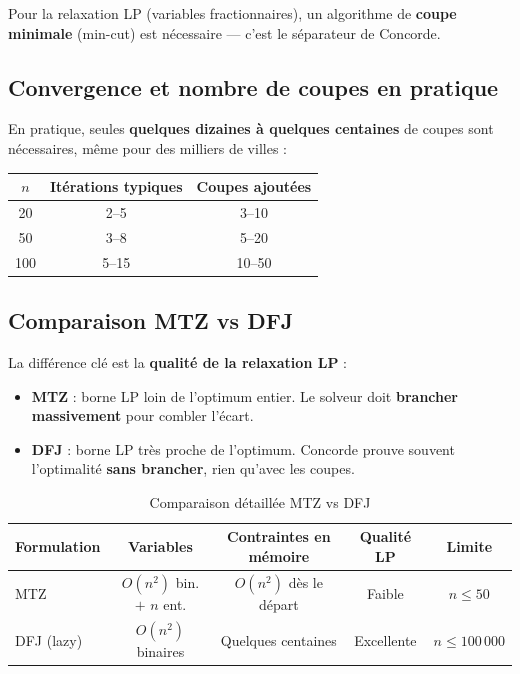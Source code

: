 \documentclass[12pt, a4paper]{article}
\begin{document}
Pour la relaxation LP (variables fractionnaires), un algorithme de
\textbf{coupe minimale} (min-cut) est nécessaire --- c'est le séparateur de Concorde.

\subsection{Convergence et nombre de coupes en pratique}

En pratique, seules \textbf{quelques dizaines à quelques centaines} de coupes
sont nécessaires, même pour des milliers de villes :

\begin{center}
\begin{tabular}{ccc}
  \toprule
  $n$ & Itérations typiques & Coupes ajoutées \\
  \midrule
  20  & 2--5  & 3--10  \\
  50  & 3--8  & 5--20  \\
  100 & 5--15 & 10--50 \\
  \bottomrule
\end{tabular}
\end{center}

\subsection{Comparaison MTZ vs DFJ}

La différence clé est la \textbf{qualité de la relaxation LP} :

\begin{itemize}
  \item \textbf{MTZ} : borne LP loin de l'optimum entier.
    Le solveur doit \textbf{brancher massivement} pour combler l'écart.
  \item \textbf{DFJ} : borne LP très proche de l'optimum.
    Concorde prouve souvent l'optimalité \textbf{sans brancher}, rien qu'avec les coupes.
\end{itemize}

\begin{table}[h]
  \centering
  \begin{tabular}{lcccc}
    \toprule
    \textbf{Formulation} & \textbf{Variables} & \textbf{Contraintes en mémoire} & \textbf{Qualité LP} & \textbf{Limite} \\
    \midrule
    MTZ        & $O(n^2)$ bin. $+$ $n$ ent. & $O(n^2)$ dès le départ  & Faible     & $n \leq 50$       \\
    DFJ (lazy) & $O(n^2)$ binaires          & Quelques centaines      & Excellente & $n \leq 100\,000$ \\
    \bottomrule
  \end{tabular}
  \caption{Comparaison détaillée MTZ vs DFJ}
\end{table}
\end{document}
